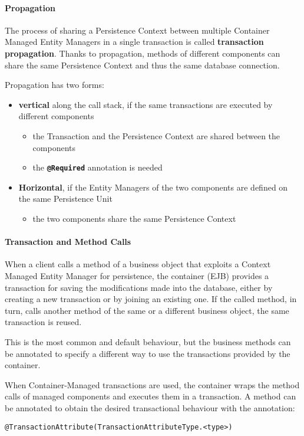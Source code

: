 \documentclass[english]{article}
\begin{document}
\paragraph{Propagation}

The process of sharing a Persistence Context between multiple Container Managed Entity Managers in a single \jta transaction is called \textbf{transaction propagation}.
Thanks to propagation, methods of different components can share the same Persistence Context and thus the same database connection.

Propagation has two forms:

\begin{itemize}
  \item \textbf{vertical} along the call stack, if the same transactions are executed by different components
        \begin{itemize}
          \item the Transaction and the Persistence Context are shared between the components
          \item the \textbf{\texttt{@Required}} annotation is needed
        \end{itemize}
  \item \textbf{Horizontal}, if the Entity Managers of the two components are defined on the same Persistence Unit
        \begin{itemize}
          \item the two components share the same Persistence Context
        \end{itemize}
\end{itemize}

\paragraph{Transaction and Method Calls}

When a client calls a method of a business object that exploits a Context Managed Entity Manager for persistence, the container (EJB) provides a transaction for saving the modifications made into the database, either by creating a new transaction or by joining an existing one.
If the called method, in turn, calls another method of the same or a different business object, the same transaction is reused.

This is the most common and default behaviour, but the business methods can be annotated to specify a different way to use the transactions provided by the container.

\bigskip
When Container-Managed transactions are used, the container wraps the method calls of managed components and executes them in a transaction.
A method can be annotated to obtain the desired transactional behaviour with the annotation:
\begin{center}
  \texttt{@TransactionAttribute(TransactionAttributeType.<type>)}
\end{center}
\end{document}
